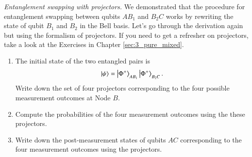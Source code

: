 \begin{exercise}
\emph{Entanglement swapping with projectors.} We demonstrated that the procedure for entanglement swapping between qubits $AB_1$ and $B_2C$ works by rewriting the state of qubit $B_1$ and $B_2$ in the Bell basis. Let's go through the derivation again but using the formalism of projectors. If you need to get a refresher on projectors, take a look at the Exercises in Chapter \ref{sec:3_pure_mixed}.
\begin{enumerate}[label=(\alph*)]
    \item The initial state of the two entangled pairs is
    \begin{equation}
        \left| \psi \right\rangle = \left| \Phi^+ \right\rangle_{AB_1} \left| \Phi^+ \right\rangle_{B_2C}.
    \end{equation}
    Write down the set of four projectors corresponding to the four possible measurement outcomes at Node $B$.
    \item Compute the probabilities of the four measurement outcomes using the these projectors.
    \item Write down the post-measurement states of qubits $AC$ corresponding to the four measurement outcomes using the projectors.
\end{enumerate}
\end{exercise}
